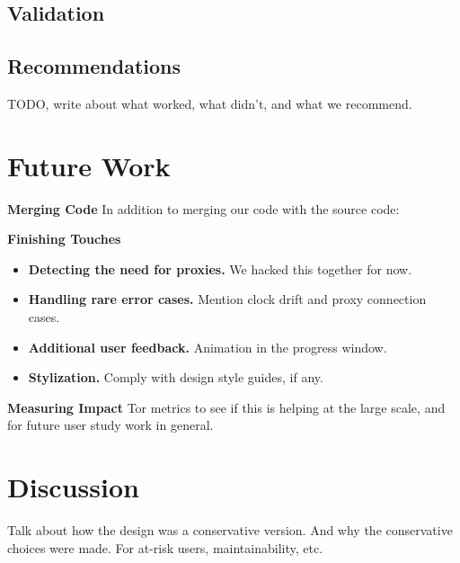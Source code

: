 \documentclass{template}
\begin{document}
\subsection{Validation} 
\subsection{Recommendations} 
TODO, write about what worked, what didn't, and what we recommend.

\section{Future Work}
{\bfseries Merging Code} In addition to merging our code with the source code: 

{\bfseries Finishing Touches} 
\begin{itemize} \itemsep1pt \parskip0pt  
\item {\bfseries Detecting the need for proxies.} We hacked this together for now. 
\item {\bfseries Handling rare error cases.} Mention clock drift and proxy connection cases.
\item {\bfseries Additional user feedback.} Animation in the progress window. 
\item {\bfseries Stylization.} Comply with design style guides, if any. 
\end{itemize} 

{\bfseries Measuring Impact} Tor metrics to see if this is helping at the large scale, and for future user study work in general. 

\section{Discussion}
Talk about how the design was a conservative version. And why the conservative choices were made. For at-risk users, maintainability, etc.
\end{document}
